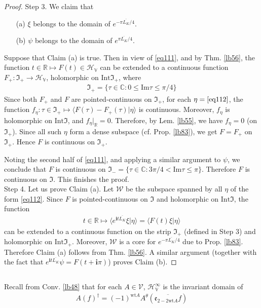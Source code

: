 \documentclass[12pt,b5paper,notitlepage]{article}
\theoremstyle{definition}
\theoremstyle{plain}
\newcommand{\fk}{\mathfrak}
\newcommand{\mc}{\mathcal}
\newcommand{\ovl}{\overline}
\newcommand{\bk}[1]{\langle {#1}\rangle}
\newcommand{\im}{\mathbf{i}}
\newcommand{\Cbb}{\mathbb C}
\newcommand{\Rbb}{\mathbb R}
\newcommand{\wt}{\mathrm{wt}}
\newcommand{\Imag}{\mathrm{Im}}
\newcommand{\Int}{\mathrm{Int}}
\newcommand{\HV}{\mathcal H_{\mathbb V}}
\newcommand{\ek}{\mathfrak{e}}
\newcommand{\MV}{\mathcal V}
\numberwithin{equation}{section}
\begin{document}
\begin{proof}
Step 3. We claim that 
\begin{enumerate}
\item[(a)] $\xi$ belongs to the domain of  $e^{-\pi\ovl{L_K}/4}$.
\item[(b)] $\psi$ belongs to the domain of $e^{\pi\ovl{L_K}/4}$.
\end{enumerate}
Suppose that Claim (a) is true. Then in view of \eqref{eq111}, and by Thm. \ref{lb56}, the function $t\in\Rbb\mapsto F(t)\in\HV$ can be extended to a continuous function $F_+:\fk I_+\rightarrow\HV$, holomorphic on $\Int\fk I_+$, where
\begin{align*}
\fk I_+=\{\tau\in\Cbb:0\leq\Imag\tau\leq\pi/4\}
\end{align*}
Since both $F_+$ and $F$ are pointed-continuous on $\fk I_+$, for each $\eta=\eqref{eq112}$, the function $f_\eta:\tau\in\fk I_+\mapsto\bk{F(\tau)-F_+(\tau)|\eta}$ is continuous. Moreover, $f_\eta$ is holomorphic on $\Int\fk I$, and $f_\eta|_\Rbb=0$. Therefore, by Lem. \ref{lb55}, we have $f_\eta=0$ (on $\fk I_+$). Since all such $\eta$ form a dense subspace (cf. Prop. \ref{lb83}), we get $F=F_+$ on $\fk I_+$. Hence $F$ is continuous on $\fk I_+$.

Noting the second half of \eqref{eq111}, and applying a similar argument to $\psi$, we conclude that $F$ is continuous on $\fk I_-=\{\tau\in\Cbb:3\pi/4<\Imag\tau\leq\pi\}$. Therefore $F$ is continuous on $\fk I$. This finishes the proof.\\[-1ex]

Step 4. Let us prove Claim (a). Let $\mc W$ be the subspace spanned by all $\eta$ of the form \eqref{eq112}. Since $F$ is pointed-continuous on $\fk I$ and holomorphic on $\Int\fk I$, the function
\begin{align*}
t\in\Rbb\mapsto\bk{e^{\im t\ovl{L_K}}\xi|\eta}=\bk{F(t)\xi|\eta}
\end{align*}
can be extended to a continuous function on the strip $\fk I_+$ (defined in Step 3) and holomorphic on $\Int\fk I_+$. Moreover, $\mc W$ is a core for $e^{-\pi\ovl{L_K}/4}$ due to Prop. \ref{lb83}. Therefore Claim (a) follows from Thm. \ref{lb56}. A similar argument (together with the fact that $e^{\im t\ovl{L_K}}\psi=F(t+\im\pi)$) proves Claim (b).
\end{proof}


\subsection{}


Recall from Conv. \ref{lb48} that for each $A\in\MV$, $\HV^\infty$ is the invariant domain of
\begin{align}\label{eq119}
A(f)^\dagger=(-1)^{\wt A}A^\theta(\ovl{\ek_{2-2\wt A}f})
\end{align}
\end{document}
